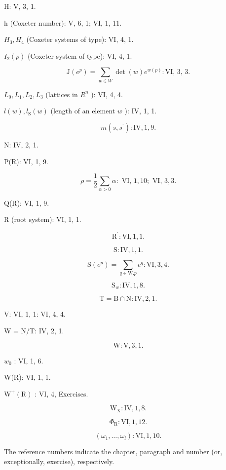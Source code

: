 H: V, 3, 1.

h (Coxeter number): V, 6, 1; VI, 1, 11.

\(H_{3}, H_{4}\) (Coxeter systems of type): VI, 4, 1.

\(I_{2}(p)\) (Coxeter system of type): VI, 4, 1.

\[
\mathrm{J} (e ^ {p}) = \sum_ {w \in W} \det (w) e ^ {w (p)}: \text {VI, 3, 3.}
\]

\(L_{0}, L_{1}, L_{2}, L_{3}\) (lattices in \(R^{n}\) ): VI, 4, 4.

\(l(w), l_{\mathrm{S}}(w)\) (length of an element \(w\) ): IV, 1, 1.

\[
m (s, s ^ {\prime}): \mathrm{IV}, 1, 9.
\]

N: IV, 2, 1.

P(R): VI, 1, 9.

\[
\rho = \frac {1}{2} \sum_ {\alpha > 0} \alpha : \text { VI, } 1, 10; \text { VI, } 3, 3.
\]

Q(R): VI, 1, 9.

R (root system): VI, 1, 1.

\[
\mathrm{R} ^ {\prime}: \mathrm{VI}, 1, 1.
\]

\[
\mathrm{S:IV,1,1.}
\]

\[
\mathrm{S} (e ^ {p}) = \sum_ {q \in \mathrm{W}. p} e ^ {q}: \mathrm{VI}, 3, 4.
\]

\[
\mathrm{S} _ {w}: \mathrm{IV}, 1, 8.
\]

\[
\mathrm{T} = \mathrm{B} \cap \mathrm{N}: \mathrm{IV}, 2, 1.
\]

V: VI, 1, 1: VI, 4, 4.

W = N/T: IV, 2, 1.

\[
\mathrm{W}: \mathrm{V}, 3, 1.
\]

\(w_{0}\) : VI, 1, 6.

W(R): VI, 1, 1.

\(\mathrm{W}^{+}(\mathrm{R})\) : VI, 4, Exercises.

\[
\mathrm{W} _ {\mathrm{X}}: \mathrm{IV}, 1, 8.
\]

\[
\Phi_ {\mathrm{R}}: \mathrm{VI}, 1, 12.
\]

\[
(\omega_ {1}, \dots , \omega_ {l}) \colon \mathrm{VI,1,10.}
\]


The reference numbers indicate the chapter, paragraph and number (or, exceptionally, exercise), respectively.

